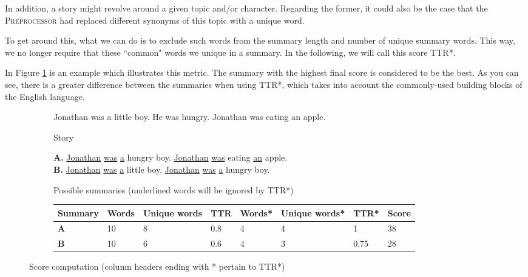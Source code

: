 In addition, a story might revolve around a given topic and/or character. Regarding the former, it could also be the case that the \textsc{Preprocessor} had replaced different synonyms of this topic with a unique word.

To get around this, what we can do is to exclude such words from the summary length and number of unique summary words. This way, we no longer require that these ``common" words we unique in a summary. In the following, we will call this score TTR*.

In Figure \ref{fig:score_example} is an example which illustrates this metric. The summary with the highest final score is considered to be the best. As you can see, there is a greater difference between the summaries when using TTR*, which takes into account the commonly-used building blocks of the English language.

\begin{figure}[H]
\begin{subfigure}{\textwidth}
\begin{displayquote}
Jonathan was a little boy. He was hungry. Jonathan was eating an apple.
\end{displayquote}
\caption{Story}
\vspace{\baselineskip}
\end{subfigure}
\begin{subfigure}{\textwidth}
\begin{displayquote}
\textbf{A.} \underline{Jonathan} \underline{was} \underline{a} hungry boy. \underline{Jonathan} \underline{was} eating \underline{an} apple.\\
\textbf{B.} \underline{Jonathan} \underline{was} \underline{a} little boy. \underline{Jonathan} \underline{was} \underline{a} hungry boy.
\end{displayquote}
\caption{Possible summaries (underlined words will be ignored by TTR*)}
\vspace{\baselineskip}
\end{subfigure}
\begin{subfigure}{\textwidth}
\centering
\begin{tabular}{@{}llllllll@{}}
\toprule
Summary & Words & Unique words & TTR & Words* & Unique words* & TTR* & Score \\ \midrule
\textbf{A} & 10    & 8            & 0.8 & 4      & 4             & 1    & 38    \\
\textbf{B} & 10    & 6            & 0.6 & 4      & 3             & 0.75 & 28    \\ \bottomrule
\end{tabular}
\end{subfigure}
\caption{Score computation (column headers ending with * pertain to TTR*)}
\label{fig:score_example}
\end{figure}

